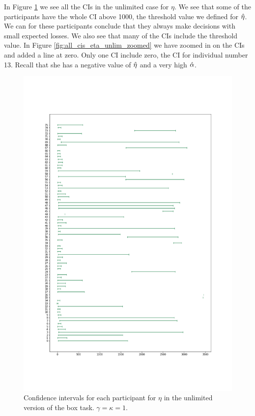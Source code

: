 In Figure \ref{fig:all_cis_eta_unlim_v2} we see all the CIs in the unlimited case for $\eta$. We see that some of the participants have the whole CI above 1000, the threshold value we defined for $\hat{\eta}$. We can for these participants conclude that they always make decisions with small expected losses. We also see that many of the CIs include the threshold value. In Figure \ref{fig:all_cis_eta_unlim_zoomed} we have zoomed in on the CIs and added a line at zero. Only one CI include zero, the CI for individual number 13. Recall that she has a negative value of $\hat{\eta}$ and a very high $\hat{\alpha}$.
\begin{figure}
    \centering
    \includegraphics[scale=0.38]{pictures/test_cis_eta_unlim.png}
    \caption[CIs for $\eta$, unlimited. $\gamma=\kappa=1$]{Confidence intervals for each participant for $\eta$ in the unlimited version of the box task. $\gamma=\kappa=1$.}
    \label{fig:all_cis_eta_unlim_v2}
\end{figure}

